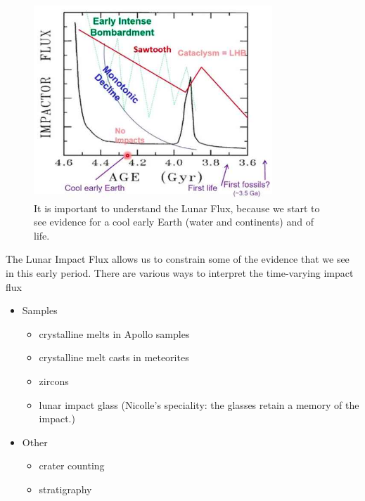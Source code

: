 \documentclass[]{article}
\begin{document}
\begin{figure}[H]
	\caption[Importance of Lunar Impact Flux Models]{It is important to understand the Lunar Flux, because we start to see evidence for a cool early Earth (water and continents) and of life.}\label{fig:LunarImpactFluxModelsLife}
	\includegraphics[width=0.8\textwidth]{LunarImpactFluxModelsLife}
\end{figure}

The Lunar Impact Flux allows us to constrain some of the evidence that we see in this early period. There are various ways to interpret the time-varying impact flux
\begin{itemize}
	\item Samples
	\begin{itemize}
		\item crystalline melts in Apollo samples
		\item crystalline melt casts in meteorites
		\item zircons
		\item lunar impact glass (Nicolle's speciality: the glasses retain a memory of the impact.)
	\end{itemize}
	\item Other
	\begin{itemize}
		\item crater counting
		\item stratigraphy
	\end{itemize}
\end{itemize}
\end{document}
